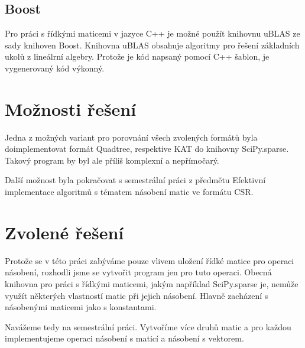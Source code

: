 \subsection{Boost}

Pro práci s řídkými maticemi v jazyce C++ je možné použít knihovnu uBLAS\cite{ublas} ze sady knihoven Boost\cite{boost}. Knihovna uBLAS obsahuje algoritmy pro řešení základních ukolů z lineálrní algebry. Protože je kód napsaný pomocí C++ šablon, je vygenerovaný kód výkonný.

\section{Možnosti řešení}

Jedna z možných variant pro porovnání všech zvolených formátů byla doimplementovat formát Quadtree, respektive KAT do knihovny SciPy.sparse. Takový program by byl ale příliš komplexní a nepřímočarý.

Další možnost byla pokračovat s semestrální práci z předmětu Efektivní implementace algoritmů s tématem násobení matic ve formátu CSR.

\section{Zvolené řešení}

Protože se v této práci zabýváme pouze vlivem uložení řídké matice pro operaci násobení, rozhodli jsme se vytvořit program jen pro tuto operaci. Obecná knihovna pro práci s řídkými maticemi, jakým například SciPy.sparse je, nemůže využít některých vlastností matic při jejich násobení. Hlavně zacházení s násobenými maticemi jako s konstantami.

Navážeme tedy na semestrální práci. Vytvoříme více druhů matic a pro každou implementujeme operaci násobení s maticí a násobení s vektorem.